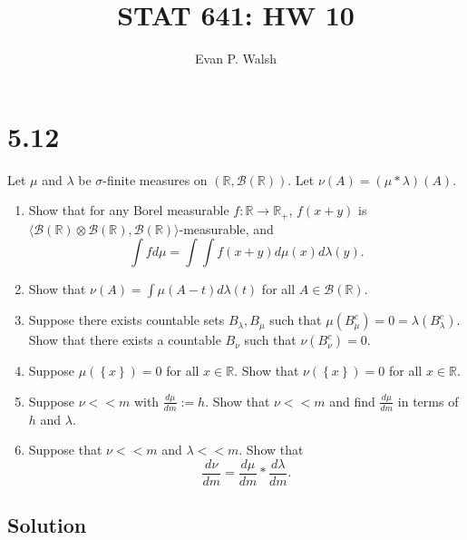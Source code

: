 \documentclass[12pt]{article}
\title{STAT 641: HW 10}
\author{Evan P. Walsh}
\begin{document}

\section*{5.12}
Let $\mu$ and $\lambda$ be $\sigma$-finite measures on $(\mathbb{R}, \mathcal{B}(\mathbb{R}))$. Let $\nu(A) = (\mu * \lambda)(A)$.
\begin{enumerate}[label=(\alph*)]
\item Show that for any Borel measurable $f : \mathbb{R} \rightarrow \mathbb{R}_{+}$, $f(x + y)$ is $\langle\mathcal{B}(\mathbb{R})\otimes
\mathcal{B}(\mathbb{R}), \mathcal{B}(\mathbb{R})\rangle$-measurable, and 
\[ \int fd\mu = \int \int f(x + y) d\mu(x) d\lambda(y). \]
\item Show that $\nu(A) = \int \mu(A - t)d\lambda(t)$ for all $A \in \mathcal{B}(\mathbb{R})$.
\item Suppose there exists countable sets $B_{\lambda}, B_{\mu}$ such that $\mu(B_{\mu}^{c}) = 0 = \lambda(B_{\lambda}^{c})$. Show that there exists a
countable $B_{\nu}$ such that $\nu(B_{\nu}^{c}) = 0$.
\item Suppose $\mu\left( \left\{ x \right\} \right) = 0$ for all $x \in \mathbb{R}$. Show that $\nu\left( \left\{ x \right\} \right) = 0$ for all $x
\in \mathbb{R}$.
\item Suppose $\nu << m$ with $\frac{d\mu}{dm} := h$. Show that $\nu << m$ and find $\frac{d\mu}{dm}$ in terms of $h$ and $\lambda$.
\item Suppose that $\nu << m$ and $\lambda << m$. Show that 
\[ \frac{d\nu}{dm} = \frac{d\mu}{dm}*\frac{d\lambda}{dm}. \]
\end{enumerate}

\subsection*{Solution}
\end{document}

